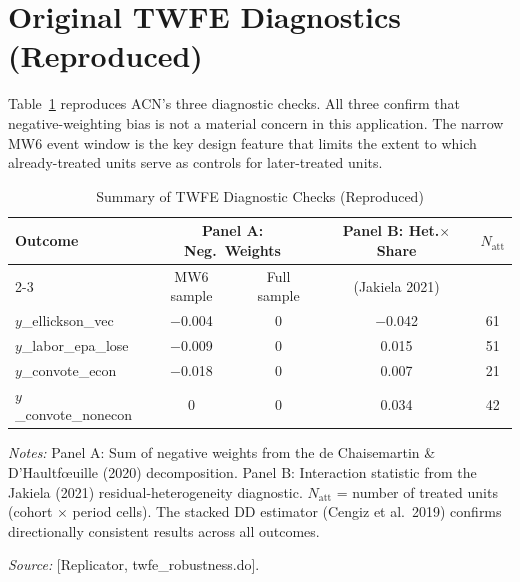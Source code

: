 \documentclass[12pt,a4paper]{article}
\begin{document}
\section{Original TWFE Diagnostics (Reproduced)}
\label{sec:diag}

Table~\ref{tab:diag_summary} reproduces ACN's three diagnostic checks. All three confirm that negative-weighting bias is not a material concern in this application. The narrow MW6 event window is the key design feature that limits the extent to which already-treated units serve as controls for later-treated units.

\begin{table}[htbp]
\centering
\caption{Summary of TWFE Diagnostic Checks (Reproduced)}
\label{tab:diag_summary}
\begin{threeparttable}
\begin{tabular}{lcccc}
\toprule
\multirow{2}{*}{Outcome}
  & \multicolumn{2}{c}{Panel A: Neg.\ Weights} & Panel B: Het.$\times$Share & \multirow{2}{*}{$N_{\text{att}}$} \\
\cmidrule(r){2-3}
  & MW6 sample & Full sample & (Jakiela 2021) & \\
\midrule
$y$\_ellickson\_vec & $-$0.004 & 0 & $-$0.042 & 61 \\
$y$\_labor\_epa\_lose & $-$0.009 & 0 & 0.015 & 51 \\
$y$\_convote\_econ & $-$0.018 & 0 & 0.007 & 21 \\
$y$\_convote\_nonecon & 0 & 0 & 0.034 & 42 \\
\bottomrule
\end{tabular}
\begin{tablenotes}
\item {\small \textit{Notes:} Panel A: Sum of negative weights from the de Chaisemartin \& D'Haultf{\oe}uille (2020) decomposition. Panel B: Interaction statistic from the Jakiela (2021) residual-heterogeneity diagnostic. $N_{\text{att}}$ = number of treated units (cohort $\times$ period cells). The stacked DD estimator (Cengiz et al.\ 2019) confirms directionally consistent results across all outcomes.}
\item {\small \textit{Source:} [Replicator, twfe\_robustness.do].}
\end{tablenotes}
\end{threeparttable}
\end{table}
\end{document}
